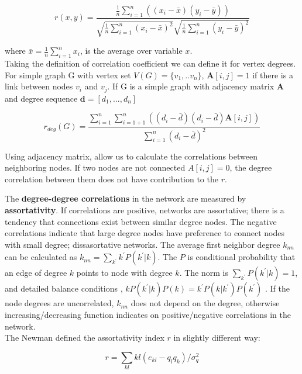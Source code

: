 \begin{equation}
r(x, y) = \frac{\frac{1}{n}\sum_{i=1}^{n}((x_i - \bar{x} ) (y_i - \bar{y}) )}{\sqrt{\frac{1}{n}\sum_{i=1}^{n}(x_i - \bar{x})^2} \sqrt{\frac{1}{n}\sum_{i=1}^{n}(y_i - \bar{y})^2} }
\end{equation}

where $\bar{x} = \frac{1}{n}\sum_{i=1}^{n}x_i$, is the average over variable $x$. \\

Taking the definition of correlation coefficient we can define it for vertex degrees. For simple graph G with vertex set $V(G) = \{v_1, ..v_n\}$, $\boldsymbol{A}[i,j] = 1$ if there is a link between nodes $v_i$ and $v_j$. If G is a simple graph with adjacency matrix $\boldsymbol{A}$ and degree sequence $\boldsymbol{d} = [d_1, ..., d_n]$

\begin{equation}
r_{deg}(G) = \frac{\sum_{i=1}^{n}\sum_{i=1+1}^{n}((d_i - \bar{d}) (d_i - \bar{d}) \boldsymbol{A}[i,j] )}{\sum_{i=1}^{n}(d_i - \bar{d})^2}
\end{equation}

Using adjacency matrix, allow us to calculate the correlations between neighboring nodes. If two nodes are not connected $A[i,j]=0$, the degree correlation between them does not have contribution to the $r$.

The \textbf{degree-degree correlations} in the network are measured by \textbf{assortativity}. If correlations are positive, networks are assortative; there is a tendency that connections exist between similar degree nodes. The negative correlations indicate that large degree nodes have preference to connect nodes with small degree; dissasortative networks. The average first neighbor degree $k_{nn}$ can be calculated as $k_{nn} = \sum_{k^{'}}k^{'}P(k^{'}|{k})$. The $P$ is conditional probability that an edge of degree $k$ points to node with degree $k$. The norm is $\sum_{k^{'}}P(k^{'}|k)=1$, and detailed balance conditions \cite{boccaletti2006},  $kP(k^{'}|k)P(k) = k^{'}P(k|k^{'})P(k^{'})$ \cite{boccaletti2006}. If the node degrees are uncorrelated, $k_{nn}$ does not depend on the degree, otherwise increasing/decreasing function indicates on positive/negative correlations in the network. \\

The Newman defined the assortativity index $r$ in slightly different way:

\begin{equation}
r = \sum_{kl}kl(e_{kl} - q_lq_k) / \sigma_q^2
\end{equation}

